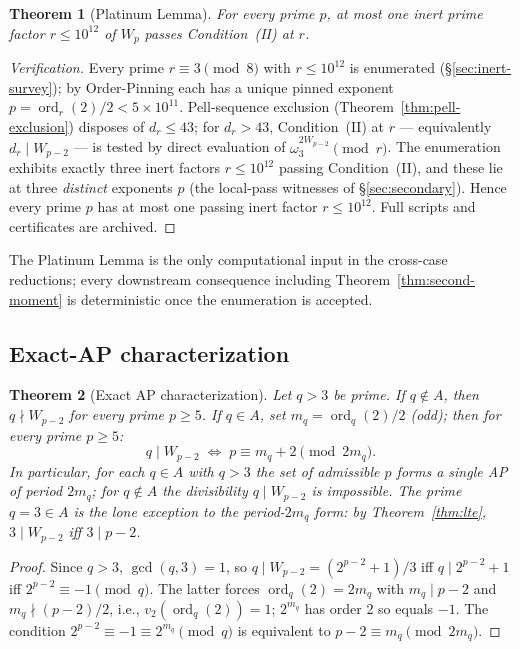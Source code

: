 \documentclass[11pt]{amsart}
\theoremstyle{plain}
\newtheorem{theorem}{Theorem}[section]
\theoremstyle{definition}
\theoremstyle{remark}
\numberwithin{equation}{section}
\newcommand{\ord}{\operatorname{ord}}
\begin{document}
\begin{theorem}[Platinum Lemma]\label{thm:platinum}
For every prime $p$, at most one inert prime factor $r \leq 10^{12}$ of $W_p$ passes Condition~(II) at $r$.
\end{theorem}

\begin{proof}[Verification]
Every prime $r \equiv 3 \pmod 8$ with $r \leq 10^{12}$ is enumerated (\S\ref{sec:inert-survey}); by Order-Pinning each has a unique pinned exponent $p = \ord_r(2)/2 < 5 \times 10^{11}$. Pell-sequence exclusion (Theorem~\ref{thm:pell-exclusion}) disposes of $d_r \leq 43$; for $d_r > 43$, Condition~(II) at $r$ --- equivalently $d_r \mid W_{p-2}$ --- is tested by direct evaluation of $\omega_3^{2 W_{p-2}} \pmod r$. The enumeration exhibits exactly three inert factors $r \leq 10^{12}$ passing Condition~(II), and these lie at three \emph{distinct} exponents $p$ (the local-pass witnesses of \S\ref{sec:secondary}). Hence every prime $p$ has at most one passing inert factor $r \leq 10^{12}$. Full scripts and certificates are archived.
\end{proof}

The Platinum Lemma is the only computational input in the cross-case reductions; every downstream consequence including Theorem~\ref{thm:second-moment} is deterministic once the enumeration is accepted.

\subsection{Exact-AP characterization}

\begin{theorem}[Exact AP characterization]\label{thm:exact-ap}
Let $q>3$ be prime. If $q\notin A$, then $q\nmid W_{p-2}$ for every prime $p\geq5$. If $q\in A$, set $m_q=\ord_q(2)/2$ (odd); then for every prime $p\geq5$:
\[
  q \mid W_{p-2} \;\Longleftrightarrow\; p \equiv m_q + 2 \pmod{2 m_q}.
\]
In particular, for each $q \in A$ with $q > 3$ the set of admissible $p$ forms a single AP of period $2 m_q$; for $q \notin A$ the divisibility $q \mid W_{p-2}$ is impossible. The prime $q = 3 \in A$ is the lone exception to the period-$2 m_q$ form: by Theorem~\ref{thm:lte}, $3 \mid W_{p-2}$ iff $3 \mid p - 2$.
\end{theorem}

\begin{proof}
Since $q > 3$, $\gcd(q, 3) = 1$, so $q \mid W_{p-2} = (2^{p-2}+1)/3$ iff $q \mid 2^{p-2} + 1$ iff $2^{p-2} \equiv -1 \pmod q$. The latter forces $\ord_q(2) = 2 m_q$ with $m_q \mid p - 2$ and $m_q \nmid (p - 2)/2$, i.e., $v_2(\ord_q(2)) = 1$; $2^{m_q}$ has order 2 so equals $-1$. The condition $2^{p-2} \equiv -1 \equiv 2^{m_q} \pmod q$ is equivalent to $p - 2 \equiv m_q \pmod{2 m_q}$.
\end{proof}
\end{document}
